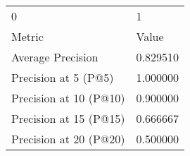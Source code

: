 \begin{tabular}{ll}
0 & 1 \\
Metric & Value \\
Average Precision & 0.829510 \\
Precision at 5 (P@5) & 1.000000 \\
Precision at 10 (P@10) & 0.900000 \\
Precision at 15 (P@15) & 0.666667 \\
Precision at 20 (P@20) & 0.500000 \\
\end{tabular}
